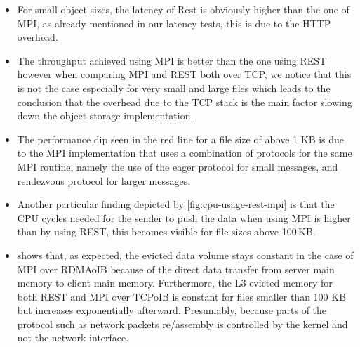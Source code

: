 \documentclass[runningheads]{llncs}
\begin{document}
\begin{itemize}
  \item For small object sizes, the latency of Rest is obviously higher than the one of MPI, as already mentioned in our latency tests, this is due to the HTTP overhead.
  \item The throughput achieved using MPI is better than the one using REST however when comparing MPI and REST both over TCP, we notice that this is not the case especially for very small and large files which leads to the conclusion that the overhead due to the TCP stack is the main factor slowing down the object storage implementation.
  \item The performance dip seen in the red line for a file size of above 1 KB is due to the MPI implementation that uses a combination of protocols for the same MPI routine, namely the use of the eager protocol \cite{eager} for small messages, and rendezvous protocol for larger messages.
  \item Another particular finding depicted by \cref{fig:cpu-usage-rest-mpi} is that the CPU cycles needed for the sender to push the data when using MPI is higher than by using REST, this becomes visible for file sizes above 100\,KB.
\item {} shows that, as expected, the evicted data volume stays constant in the case of MPI over RDMAoIB because of the direct data transfer from server main memory to client main memory. Furthermore, the L3-evicted memory for both REST and MPI over TCPoIB is constant for files smaller than 100 KB but increases exponentially afterward. Presumably, because parts of the protocol such as network packets re/assembly is controlled by the kernel and not the network interface.
\end{itemize}
\end{document}
